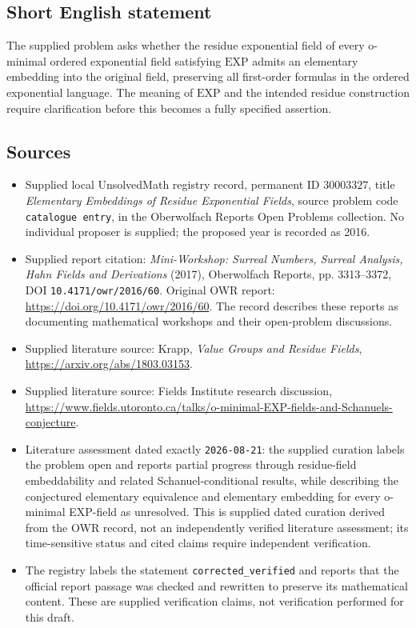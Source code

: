 \documentclass[11pt]{article}
\begin{document}
\subsection{Short English statement}
The supplied problem asks whether the residue exponential field of every o-minimal ordered exponential field satisfying \(\mathrm{EXP}\) admits an elementary embedding into the original field, preserving all first-order formulas in the ordered exponential language. The meaning of \(\mathrm{EXP}\) and the intended residue construction require clarification before this becomes a fully specified assertion.
\subsection{Sources}
\begin{itemize}
\item Supplied local UnsolvedMath registry record, permanent ID \(30003327\), title \emph{Elementary Embeddings of Residue Exponential Fields}, source problem code \texttt{catalogue entry}, in the Oberwolfach Reports Open Problems collection. No individual proposer is supplied; the proposed year is recorded as 2016.
\item Supplied report citation: \emph{Mini-Workshop: Surreal Numbers, Surreal Analysis, Hahn Fields and Derivations} (2017), Oberwolfach Reports, pp. 3313--3372, DOI \texttt{10.4171/owr/2016/60}. Original OWR report: \url{https://doi.org/10.4171/owr/2016/60}. The record describes these reports as documenting mathematical workshops and their open-problem discussions.
\item Supplied literature source: Krapp, \emph{Value Groups and Residue Fields}, \url{https://arxiv.org/abs/1803.03153}.
\item Supplied literature source: Fields Institute research discussion, \url{https://www.fields.utoronto.ca/talks/o-minimal-EXP-fields-and-Schanuels-conjecture}.
\item Literature assessment dated exactly \texttt{2026-08-21}: the supplied curation labels the problem open and reports partial progress through residue-field embeddability and related Schanuel-conditional results, while describing the conjectured elementary equivalence and elementary embedding for every o-minimal EXP-field as unresolved. This is supplied dated curation derived from the OWR record, not an independently verified literature assessment; its time-sensitive status and cited claims require independent verification.
\item The registry labels the statement \texttt{corrected\_verified} and reports that the official report passage was checked and rewritten to preserve its mathematical content. These are supplied verification claims, not verification performed for this draft.
\end{itemize}
\end{document}
